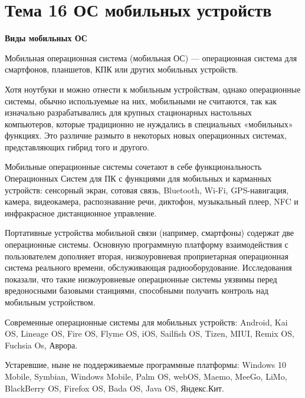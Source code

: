   \newpage 
  \chapter{Тема 16 ОС мобильных устройств}

  \begin{center}{\bfseries Виды мобильных ОС}
  \end{center}

  \begin{opr}
    Мобильная операционная система (мобильная ОС) — операционная система для смартфонов, планшетов, КПК или других мобильных устройств.
  \end{opr}

  Хотя ноутбуки и можно отнести к мобильным устройствам, однако операционные системы, обычно используемые на них, мобильными не считаются, так как изначально разрабатывались для крупных стационарных настольных компьютеров, которые традиционно не нуждались в специальных «мобильных» функциях. Это различие размыто в некоторых новых операционных системах, представляющих гибрид того и другого.

  Мобильные операционные системы сочетают в себе функциональность Операционных Систем для ПК с функциями для мобильных и карманных устройств: сенсорный экран, сотовая связь, Bluetooth, Wi-Fi, GPS-навигация, камера, видеокамера, распознавание речи, диктофон, музыкальный плеер, NFC и инфракрасное дистанционное управление.

  Портативные устройства мобильной связи (например, смартфоны) содержат две операционные системы. Основную программную платформу взаимодействия с пользователем дополняет вторая, низкоуровневая проприетарная операционная система реального времени, обслуживающая радиооборудование. Исследования показали, что такие низкоуровневые операционные системы уязвимы перед вредоносными базовыми станциями, способными получить контроль над мобильным устройством.

  \begin{example}
    Современные операционные системы для мобильных устройств: Android, Kai OS, Lineage OS, Fire OS, Flyme OS, iOS, Sailfish OS, Tizen, MIUI, Remix OS, Fuchsia Os, Аврора.
  \end{example}

  \begin{example}
    Устаревшие, ныне не поддерживаемые программные платформы: Windows 10 Mobile, Symbian, Windows Mobile, Palm OS, webOS, Maemo, MeeGo, LiMo, BlackBerry OS, Firefox OS, Bada OS, Java OS, Яндекс.Кит.
  \end{example}

